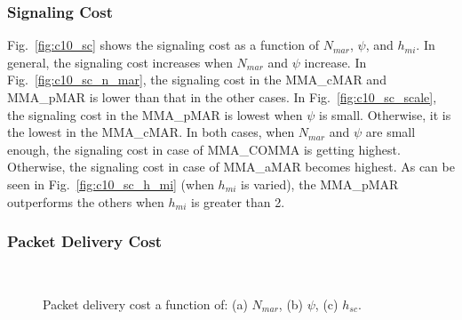 \subsubsection{Signaling Cost}
Fig.~\ref{fig:c10_sc} shows the signaling cost as a function of  $N_{mar}$, $\psi$, and $h_{mi}$. In general, the signaling cost increases when $N_{mar}$ and $\psi$ increase. In Fig.~\ref{fig:c10_sc_n_mar}, the signaling cost in the MMA\_cMAR and MMA\_pMAR is lower than that in the other cases. In Fig.~\ref{fig:c10_sc_scale}, the signaling cost in the MMA\_pMAR is lowest when $\psi$ is small. Otherwise, it is the lowest in the MMA\_cMAR. In both cases, when $N_{mar}$ and $\psi$ are small enough, the signaling cost in case of MMA\_COMMA is getting highest. Otherwise, the signaling cost in case of MMA\_aMAR becomes highest. As can be seen in Fig.~\ref{fig:c10_sc_h_mi} (when $h_{mi}$ is varied), the MMA\_pMAR outperforms the others when $h_{mi}$ is greater than 2. 

\subsubsection{Packet Delivery Cost}
\begin{figure}[h!]
\centering
{}
\,
\caption[Packet delivery cost.]{Packet delivery cost a function of: (a) $N_{mar}$, (b) $\psi$, (c) $h_{sc}$.}
\label{fig:c10_pc}
\end{figure}

